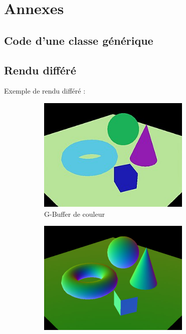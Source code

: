 \newpage
\section{Annexes}
\subsection{Code d'une classe générique}

\subsection{Rendu différé}
\label{sec:deferred_rendering}
Exemple de rendu différé :
\begin{figure}[h]
    \begin{subfigure}{0.5\textwidth}
        \centering
        \includegraphics[width=0.8\textwidth]{images/Deferred_rendering_pass_col.jpg}
        \caption{G-Buffer de couleur}
        \label{fig:drendering_pass_col}
    \end{subfigure}
    \begin{subfigure}{0.5\textwidth}
        \centering
        \includegraphics[width=0.8\textwidth]{images/Deferred_rendering_pass_nor.jpg}

\end{subfigure}
\end{figure}
